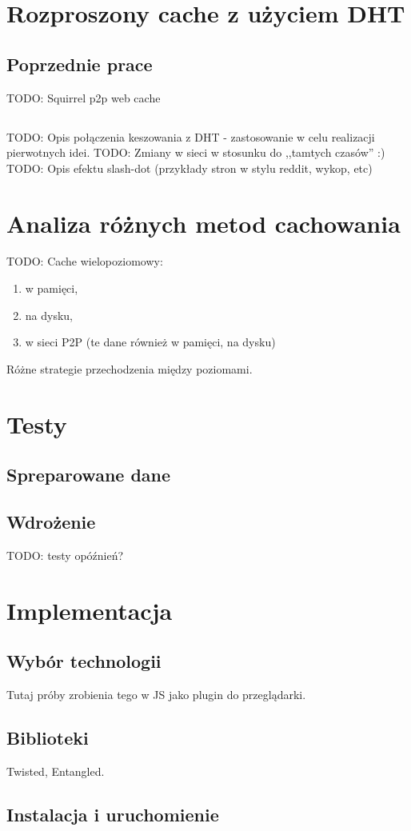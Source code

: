 \documentclass[a4paper,11pt]{scrartcl}
\newcommand{\s}{ }
\newcommand{\kesz}{cache}
\begin{document}
\section{Rozproszony \kesz\s z użyciem DHT}

\subsection{Poprzednie prace}
TODO: Squirrel p2p web cache \cite{iyer2002squirrel}

\subsection{}
TODO: Opis połączenia keszowania z DHT - zastosowanie w celu realizacji pierwotnych idei. 
TODO: Zmiany w sieci w stosunku do ,,tamtych czasów'' :)
TODO: Opis efektu slash-dot (przykłady stron w stylu reddit, wykop, etc)

\section{Analiza różnych metod cachowania}
TODO:
Cache wielopoziomowy:
\begin{enumerate}
  \item w pamięci,
  \item na dysku,
  \item w sieci P2P (te dane również w pamięci, na dysku)
\end{enumerate}
Różne strategie przechodzenia między poziomami.

\section{Testy}
\subsection{Spreparowane dane}


\subsection{Wdrożenie}
TODO: testy opóźnień?

\section{Implementacja}
\subsection{Wybór technologii}
Tutaj próby zrobienia tego w JS jako plugin do przeglądarki.
\subsection{Biblioteki}
Twisted, Entangled.
\subsection{Instalacja i uruchomienie}





\end{document}
